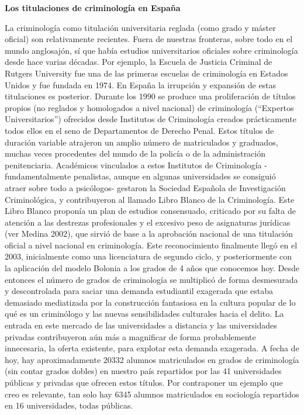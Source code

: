 \documentclass[
  spanish,
  letterpaper,
  DIV=11,
  numbers=noendperiod]{scrreprt}
\begin{document}
\begin{tcolorbox}[enhanced jigsaw, bottomtitle=1mm, toprule=.15mm, colbacktitle=quarto-callout-note-color!10!white, bottomrule=.15mm, leftrule=.75mm, colframe=quarto-callout-note-color-frame, opacitybacktitle=0.6, titlerule=0mm, breakable, colback=white, left=2mm, arc=.35mm, title=\textcolor{quarto-callout-note-color}{\faInfo}\hspace{0.5em}{Nota}, toptitle=1mm, coltitle=black, rightrule=.15mm, opacityback=0]

\textbf{Los titulaciones de criminología en España}

La criminología como titulación universitaria reglada (como grado y
máster oficial) son relativamente recientes. Fuera de nuestras
fronteras, sobre todo en el mundo anglosajón, sí que había estudios
universitarios oficiales sobre criminología desde hace varias décadas.
Por ejemplo, la Escuela de Justicia Criminal de Rutgers University fue
una de las primeras escuelas de criminología en Estados Unidos y fue
fundada en 1974. En España la irrupción y expansión de estas
titulaciones es posterior. Durante los 1990 se produce una proliferación
de títulos propios (no reglados y homologados a nivel nacional) de
criminología (``Expertos Universitarios'') ofrecidos desde Institutos de
Criminología creados prácticamente todos ellos en el seno de
Departamentos de Derecho Penal. Estos títulos de duración variable
atrajeron un amplio número de matriculados y graduados, muchas veces
procedentes del mundo de la policía o de la administración
penitenciaria. Académicos vinculados a estos Institutos de Criminología
-fundamentalmente penalistas, aunque en algunas universidades se
consiguió atraer sobre todo a psicólogos- gestaron la Sociedad Española
de Investigación Criminológica, y contribuyeron al llamado Libro Blanco
de la Criminología. Este Libro Blanco proponía un plan de estudios
consensuado, criticado por su falta de atención a las destrezas
profesionales y el excesivo peso de asignaturas jurídicas (ver Medina
2002), que sirvió de base a la aprobación nacional de una titulación
oficial a nivel nacional en criminología. Este reconocimiento finalmente
llegó en el 2003, inicialmente como una licenciatura de segundo ciclo, y
posteriormente con la aplicación del modelo Bolonia a los grados de 4
años que conocemos hoy. Desde entonces el número de grados de
criminología se multiplicó de forma desmesurada y descontrolada para
saciar una demanda estudiantil exagerada que estaba demasiado
mediatizada por la construcción fantasiosa en la cultura popular de lo
qué es un criminólogo y las nuevas sensibilidades culturales hacia el
delito. La entrada en este mercado de las universidades a distancia y
las universidades privadas contribuyeron aún más a magnificar de forma
probablemente innecesaria, la oferta existente, para explotar esta
demanda exagerada. A fecha de hoy, hay aproximadamente 20332 alumnos
matriculados en grados de criminología (sin contar grados dobles) en
nuestro país repartidos por las 41 universidades públicas y privadas que
ofrecen estos títulos. Por contraponer un ejemplo que creo es relevante,
tan solo hay 6345 alumnos matriculados en sociología repartidos en 16
universidades, todas públicas.


\end{tcolorbox}
\end{document}
